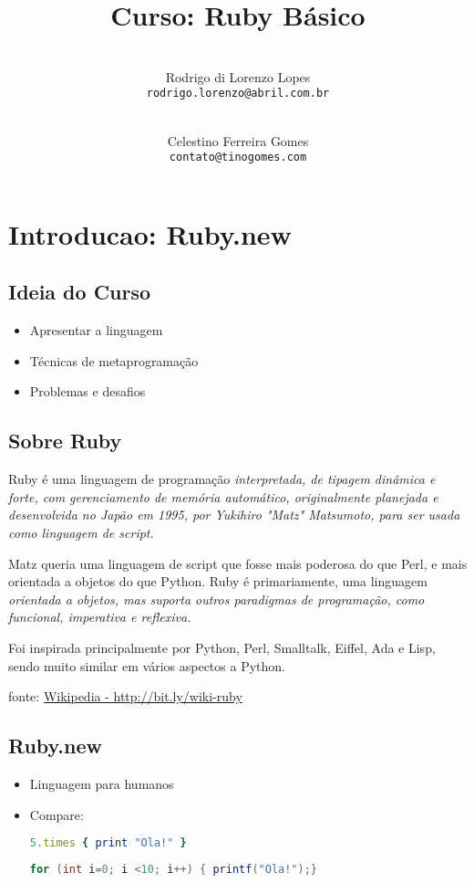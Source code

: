 \documentclass[serif,mathserif]{article}
\author{ 
    \\ Rodrigo di Lorenzo Lopes \\  \texttt{rodrigo.lorenzo@abril.com.br}
	\and 
    \\ Celestino Ferreira Gomes \\ \texttt{contato@tinogomes.com}
}
\title{Curso: Ruby Básico}
\begin{document}
\maketitle
 
\tableofcontents

\section{Introducao: Ruby.new}

\subsection{Ideia do Curso}

\begin{itemize}
  \item Apresentar a linguagem
  \item Técnicas de metaprogramação
  \item Problemas e desafios
\end{itemize}

\subsection{Sobre Ruby}
Ruby é uma linguagem de programação \em{interpretada}, de \em{tipagem dinâmica} e \em{forte}, com \em{gerenciamento de memória automático}, originalmente planejada e desenvolvida no Japão em 1995, por Yukihiro "Matz" Matsumoto, para ser usada como linguagem de script.

Matz queria uma linguagem de script que fosse mais poderosa do que Perl, e mais orientada a objetos do que Python. Ruby é primariamente, uma linguagem \em{orientada a objetos}, mas suporta outros paradigmas de programação, como \em{funcional}, \em{imperativa}  e \em{reflexiva}.

Foi inspirada principalmente por Python, Perl, Smalltalk, Eiffel, Ada e Lisp, sendo muito similar em vários aspectos a Python.

fonte: \href{http://bit.ly/wiki-ruby}{Wikipedia - http://bit.ly/wiki-ruby}

\subsection{Ruby.new}

\begin{itemize}
\item Linguagem para humanos
\item Compare:
\begin{lstlisting}[language=ruby]
5.times { print "Ola!" }
\end{lstlisting}

\begin{lstlisting}[language=java]
for (int i=0; i <10; i++) { printf("Ola!");}
\end{lstlisting}

\end{itemize}
\end{document}
